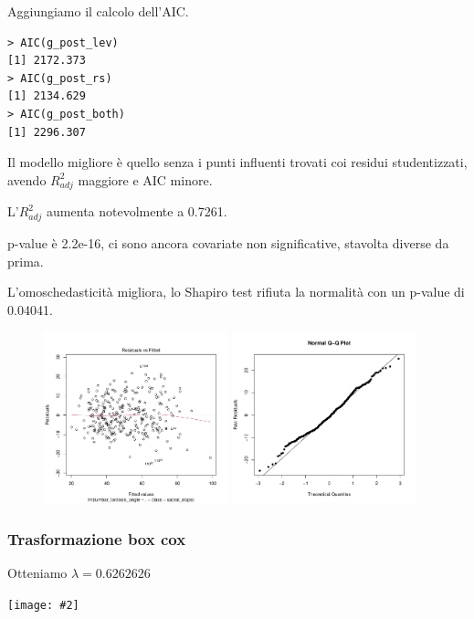 \documentclass{beamer}
\newcommand{\fg}[2]{%
  \begin{center}
      \texttt{[image: \#2]}%
  \end{center}
}
\begin{document}
\begin{frame}[fragile]
	Aggiungiamo il calcolo dell'AIC.
	\begin{verbatim}
> AIC(g_post_lev)
[1] 2172.373
> AIC(g_post_rs)
[1] 2134.629
> AIC(g_post_both)
[1] 2296.307
	\end{verbatim}

	Il modello migliore è quello senza i punti influenti trovati coi residui studentizzati, avendo $R^{2}_{adj}$ maggiore e AIC minore.

	L'$R^2_{adj}$ aumenta notevolmente a 0.7261.

	p-value è 2.2e-16, ci sono ancora covariate non significative, stavolta diverse da prima.
\end{frame}



\begin{frame}
	L'omoschedasticità migliora, lo Shapiro test rifiuta la normalità con un p-value di 0.04041.
	\begin{figure}
	   \includegraphics[width=0.475\textwidth]{07omoschedasticita}
	   \hfill
	   \includegraphics[width=0.475\textwidth]{08qqplot}
	\end{figure}
\end{frame}


\begin{frame}
	\frametitle{Trasformazione box cox}
	Otteniamo $\lambda = 0.6262626$
	\fg{0.6}{09boxcox}
\end{frame}
\end{document}
